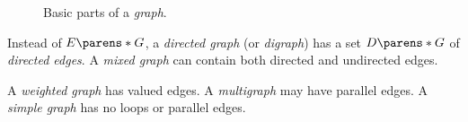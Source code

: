 \begin{figure}[H]


    \caption{Basic parts of a \emph{graph}.}
    \label{fig:graphs--basic-definitions--1}
\end{figure}

Instead of $E \parens*{G}$, a \emph{directed graph} (or \emph{digraph}) has a set $D \parens*{G}$ of \emph{directed edges}. A \emph{mixed graph} can contain both directed and undirected edges.

A \emph{weighted graph} has valued edges. A \emph{multigraph} may have parallel edges. A \emph{simple graph} has no loops or parallel edges.

